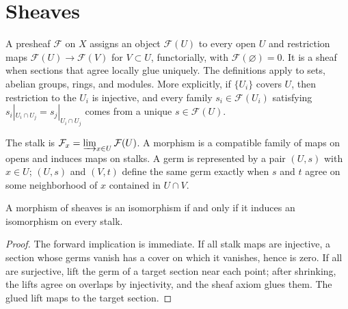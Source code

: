 
\section{Sheaves}

\begin{definition}
\label{def:II-1-presheaf}
\leanok
A presheaf $\mathcal F$ on $X$ assigns an object $\mathcal F(U)$ to every open $U$ and restriction maps
$\mathcal F(U)\to\mathcal F(V)$ for $V\subset U$, functorially, with $\mathcal F(\varnothing)=0$.
It is a sheaf when sections that agree locally glue uniquely. The definitions apply to sets,
abelian groups, rings, and modules.
More explicitly, if $\{U_i\}$ covers $U$, then restriction to the $U_i$ is injective, and every
family $s_i\in\mathcal F(U_i)$ satisfying
$s_i|_{U_i\cap U_j}=s_j|_{U_i\cap U_j}$ comes from a unique $s\in\mathcal F(U)$.
\end{definition}

\begin{definition}
\label{def:II-1-stalk}
\leanok
The stalk is $\mathcal F_x=\varinjlim_{x\in U}\mathcal F(U)$. A morphism is a compatible family
of maps on opens and induces maps on stalks.  A germ is represented by a pair $(U,s)$ with $x\in U$;
$(U,s)$ and $(V,t)$ define the same germ exactly when $s$ and $t$ agree on some neighborhood of $x$
contained in $U\cap V$.
\end{definition}

\begin{proposition}
\label{prop:II-1-1}
\leanok
A morphism of sheaves is an isomorphism if and only if it induces an isomorphism on every stalk.
\end{proposition}
\begin{proof}
The forward implication is immediate. If all stalk maps are injective, a section whose germs vanish
has a cover on which it vanishes, hence is zero. If all are surjective, lift the germ of a target
section near each point; after shrinking, the lifts agree on overlaps by injectivity, and the sheaf
axiom glues them. The glued lift maps to the target section.
\end{proof}


